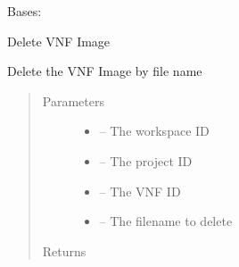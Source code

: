 \documentclass[letterpaper,10pt,english]{sphinxmanual}
\begin{document}

\begin{fulllineitems}
\label{_source/son_editor.apis:son_editor.apis.project_functionsapi.FunctionUpload}
Bases: 

\begin{fulllineitems}
\label{_source/son_editor.apis:son_editor.apis.project_functionsapi.FunctionUpload.delete}
Delete VNF Image

Delete the VNF Image by file name
\begin{quote}\begin{description}
\item[{Parameters}] \leavevmode\begin{itemize}
\item {} 
 -- The workspace ID

\item {} 
 -- The project ID

\item {} 
 -- The VNF ID

\item {} 
 -- The filename to delete

\end{itemize}

\item[{Returns}] \leavevmode


\end{description}\end{quote}

\end{fulllineitems}


\begin{fulllineitems}
\label{_source/son_editor.apis:son_editor.apis.project_functionsapi.FunctionUpload.methods}
\end{fulllineitems}


\end{fulllineitems}
\end{document}
